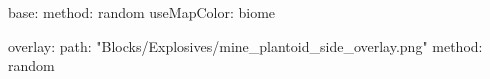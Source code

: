 base:
  method: random
  useMapColor: biome

overlay:
  path: "Blocks/Explosives/mine_plantoid_side_overlay.png"
  method: random
